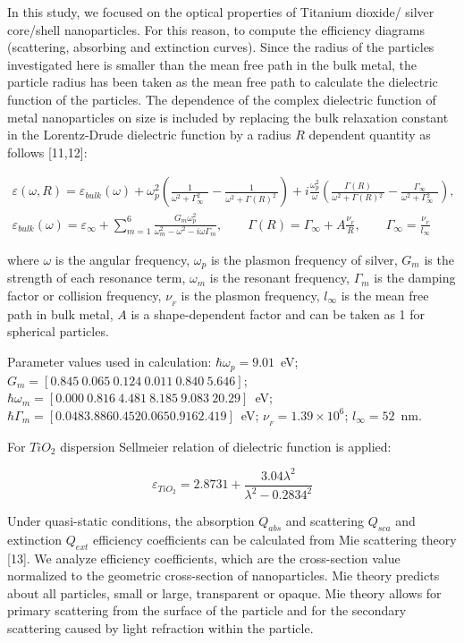 \documentclass[aip,jap,reprint]{revtex4-1}
\begin{document}
In this study, we focused on the optical properties of Titanium
dioxide/ silver core/shell nanoparticles. For this reason, to compute
the efficiency diagrams (scattering, absorbing and extinction curves).
Since the radius of the particles investigated here is smaller than
the mean free path in the bulk metal, the particle radius has been
taken as the mean free path to calculate the dielectric function of
the particles. The dependence of the complex dielectric function of
metal nanoparticles on size is included by replacing the bulk
relaxation constant in the Lorentz-Drude dielectric function by a
radius $R$ dependent quantity as follows [11,12]:
\begin{widetext}
\begin{align*}
\varepsilon(\omega,R) = \varepsilon_{bulk}(\omega) 
+ \omega^2_p
\left(
  \frac{1}{\omega^2 +{\Gamma}^2_{\infty\phantom{A}}} -
  \frac{1}{\omega^2 +\Gamma(R)^{2}_{\phantom{A}}} 
\right)
+ i \frac{\omega^2_p}{\omega}
\left (
  \frac{\Gamma(R)}{\omega^2+\Gamma(R){^2_{\phantom{A}}}}
  - \frac{\Gamma_\infty}{\omega^2+\Gamma{^{2}_{\infty\phantom{A}}}}
\right) ,\\ 
\varepsilon_{bulk}(\omega) = \varepsilon_\infty 
+ \sum^6_{m=1} \frac{G_m \omega^2_p}{\omega_m^2 - \omega^2 -i \omega
  \Gamma_m} , \qquad
  \Gamma(R) = \Gamma_\infty + A\frac{\nu_{\! _F}}{R}, \qquad
  \Gamma_\infty = \frac{\nu_{\! _F}}{l_\infty}
\end{align*}
\end{widetext}
where $\omega$
is the angular frequency, $\omega_p$
is the plasmon frequency of silver, $G_m$
is the strength of each resonance term, $\omega_m$
is the resonant frequency, $\Gamma_m$
is the damping factor or collision frequency, $\nu_{\! _F}$
is the plasmon frequency, $l_\infty$
is the mean free path in bulk metal, $A$
is a shape-dependent factor and can be taken as 1 for spherical
particles.

Parameter values used in calculation: $\hbar\omega_p = 9.01$~eV;
$G_m = [0.845\ 0.065\ 0.124\ 0.011\ 0.840\ 5.646]$; 
$\hbar\omega_m = [0.000\ 0.816\ 4.481\ 8.185\ 9.083\ 20.29]$~eV;
$\hbar\Gamma_m = [0.048 3.886 0.452 0.065 0.916 2.419]$~eV;
$\nu_{\! _F} = 1.39 \times 10^6$; $l_\infty = 52$~nm.

For $TiO_2$ dispersion Sellmeier relation of dielectric function is
applied: 

$$
\varepsilon_{TiO_2} = 2.8731 + \frac{3.04\lambda^2}{\lambda^2-0.2834^2}
$$

Under quasi-static conditions, the absorption $Q_{abs}$ and scattering $Q_{sca}$
and extinction $Q_{ext}$ efficiency coefficients can be calculated from Mie
scattering theory [13]. We analyze efficiency coefficients, which are
the cross-section value normalized to the geometric cross-section of
nanoparticles. Mie theory predicts about all particles, small or large,
transparent or opaque. Mie theory allows for primary scattering from
the surface of the particle and for the secondary scattering caused by
light refraction within the particle.
\end{document}
